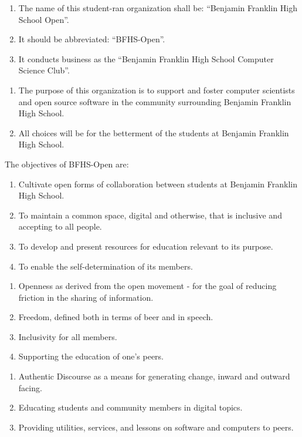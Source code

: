 
\begin{enumerate}
	\item The name of this student-ran organization shall be: “Benjamin Franklin
		High School Open”.

	\item It should be abbreviated: “BFHS-Open”.

	\item It conducts business as the “Benjamin Franklin High School Computer Science
		Club”.
\end{enumerate}

\begin{enumerate}
	\item The purpose of this organization is to support and foster computer scientists
		and open source software in the community surrounding Benjamin Franklin High
		School.

	\item All choices will be for the betterment of the students at Benjamin Franklin
		High School.
\end{enumerate}

 The objectives of BFHS-Open are:
\begin{enumerate}
	\item Cultivate open forms of collaboration between students at Benjamin Franklin
		High School.

	\item To maintain a common space, digital and otherwise, that is inclusive and
		accepting to all people.

	\item To develop and present resources for education relevant to its purpose.

	\item To enable the self-determination of its members.
\end{enumerate}

\begin{enumerate}
	\item Openness as derived from the open movement - for the goal of reducing friction
		in the sharing of information.

	\item Freedom, defined both in terms of beer and in speech.

	\item Inclusivity for all members.

	\item Supporting the education of one’s peers.
\end{enumerate}

\begin{enumerate}
	\item Authentic Discourse as a means for generating change, inward and outward
		facing.

	\item Educating students and community members in digital topics.

	\item Providing utilities, services, and lessons on software and computers to peers.
\end{enumerate}